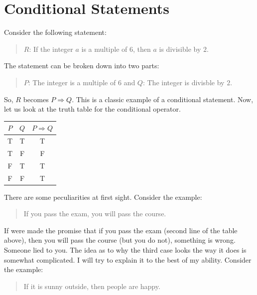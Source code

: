 \section{Conditional Statements}

Consider the following statement:
\begin{quote}
    $R$: If the integer $a$ is a multiple of $6$, then $a$ is divisible by $2$. 
\end{quote}
The statement can be broken down into two parts: 
\begin{quote}
    $P$: The integer is a multiple of $6$ and $Q$: The integer is divisble by $2$.
\end{quote}
So, $R$ becomes $P\Rightarrow Q$. This is a classic example of a conditional statement. Now, let us look at the truth table for the conditional operator. 
\begin{table}[H]
    \centering
    \begin{tabular}{ccc}
        \toprule
        $P$ & $Q$ & $P\Rightarrow Q$\\
        \midrule
        T & T & T \\
        
        T & F & F \\
        
        F & T & T \\
        
        F & F & T\\
        \bottomrule
    \end{tabular}
\end{table}
There are some peculiarities at first sight. Consider the example: 
\begin{quote}
    If you pass the exam, you will pass the course. 
\end{quote}
If were made the promise that if you pass the exam (second line of the table above), then you will pass the course (but you do not), something is wrong. Someone lied to you. The idea as to why the third case looks the way it does is somewhat complicated. I will try to explain it to the best of my ability. Consider the example: 
\begin{quote}
    If it is sunny outside, then people are happy. 
\end{quote}
